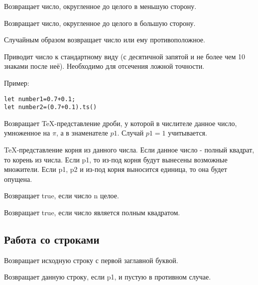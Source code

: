 
Возвращает число, округленное до целого в меньшую сторону.


Возвращает число, округленное до целого в большую сторону.


Случайным образом возвращает число или ему противоположное.

Приводит число к стандартному виду (с десятичной запятой и не более чем 10 знаками после неё).
Необходимо для отсечения ложной точности.

Пример:%
\begin{lstlisting}[frame=none]
let number1=0.7+0.1;
let number2=(0.7+0.1).ts()
\end{lstlisting}




Возвращает TeX-представление дроби, у которой в числителе данное число, умноженное на $\pi$, а в знаменателе $p1$.
Случай $p1=1$ учитывается.


TeX-представление корня из данного числа.
Если данное число - полный квадрат, то корень из числа.
Если p1, то из-под корня будут вынесены возможные множители.
Если p1, p2 и из-под корня выносится единица, то она будет опущена.


Возвращает true, если число n целое.


Возвращает true, если число является полным квадратом.

\subsection{Работа со строками}

\hypertarget{toZagl}{}

Возвращает исходную строку с первой заглавной буквой.


Возвращает данную строку, если p1, и пустую в противном случае.

